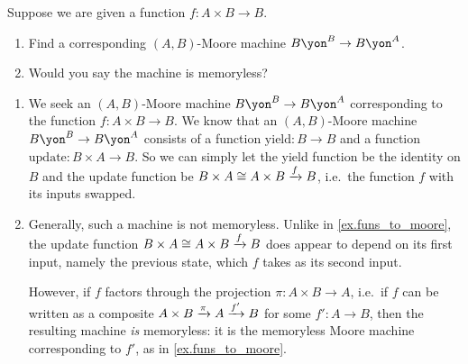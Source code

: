 \documentclass[Book-Poly]{subfiles}
\begin{document}
\begin{exercise}\label{exc.funs_to_moore}
Suppose we are given a function $f\colon A\times B\to B$.
\begin{enumerate}
	\item Find a corresponding $(A,B)$-Moore machine $B\yon^B\to B\yon^A$.
	\item Would you say the machine is memoryless?
\qedhere
\end{enumerate}
\begin{solution}
\begin{enumerate}
    \item We seek an $(A,B)$-Moore machine $B\yon^B\to B\yon^A$ corresponding to the function $f\colon A\times B\to B$.
    We know that an $(A,B)$-Moore machine $B\yon^B \to B\yon^A$ consists of a function $\text{yield} \colon B \to B$ and a function $\text{update} \colon B \times A \to B$.
    So we can simply let the yield function be the identity on $B$ and the update function be $B \times A \cong A \times B \xrightarrow{f} B$, i.e.\ the function $f$ with its inputs swapped.
    
    \item Generally, such a machine is not memoryless.
    Unlike in \cref{ex.funs_to_moore}, the update function $B \times A \cong A \times B \xrightarrow{f} B$ does appear to depend on its first input, namely the previous state, which $f$ takes as its second input.
    
    However, if $f$ factors through the projection $\pi \colon A \times B \to A$, i.e.\ if $f$ can be written as a composite $A \times B \xrightarrow{\pi} A \xrightarrow{f'} B$ for some $f' \colon A \to B$, then the resulting machine \emph{is} memoryless: it is the memoryless Moore machine corresponding to $f'$, as in \cref{ex.funs_to_moore}.
\end{enumerate}
\end{solution}
\end{exercise}
\end{document}
